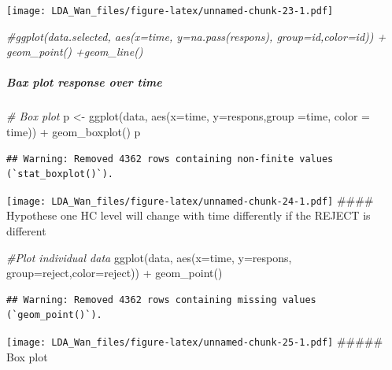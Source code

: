 \documentclass[
]{article}
\newenvironment{Shaded}{\begin{snugshade}}{\end{snugshade}}
\newcommand{\AttributeTok}[1]{\textcolor[rgb]{0.77,0.63,0.00}{#1}}
\newcommand{\CommentTok}[1]{\textcolor[rgb]{0.56,0.35,0.01}{\textit{#1}}}
\newcommand{\FunctionTok}[1]{\textcolor[rgb]{0.00,0.00,0.00}{#1}}
\newcommand{\NormalTok}[1]{#1}
\newcommand{\OtherTok}[1]{\textcolor[rgb]{0.56,0.35,0.01}{#1}}
\newcommand{\SpecialCharTok}[1]{\textcolor[rgb]{0.00,0.00,0.00}{#1}}
\begin{document}
\texttt{[image: LDA\_Wan\_files/figure-latex/unnamed-chunk-23-1.pdf]}

\begin{Shaded}
\begin{Highlighting}[]
\CommentTok{\#ggplot(data.selected, aes(x=time, y=na.pass(respons), group=id,color=id)) + geom\_point()  +geom\_line()}
\end{Highlighting}
\end{Shaded}

\hypertarget{bax-plot-response-over-time}{%
\subparagraph{Bax plot response over
time}\label{bax-plot-response-over-time}}

\begin{Shaded}
\begin{Highlighting}[]
\CommentTok{\# Box plot}
\NormalTok{p }\OtherTok{\textless{}{-}} \FunctionTok{ggplot}\NormalTok{(data, }\FunctionTok{aes}\NormalTok{(}\AttributeTok{x=}\NormalTok{time, }\AttributeTok{y=}\NormalTok{respons,}\AttributeTok{group =}\NormalTok{time, }\AttributeTok{color =}\NormalTok{ time)) }\SpecialCharTok{+}  
  \FunctionTok{geom\_boxplot}\NormalTok{()}
\NormalTok{p}
\end{Highlighting}
\end{Shaded}

\begin{verbatim}
## Warning: Removed 4362 rows containing non-finite values (`stat_boxplot()`).
\end{verbatim}

\texttt{[image: LDA\_Wan\_files/figure-latex/unnamed-chunk-24-1.pdf]}
\#\#\#\# Hypothese one HC level will change with time differently if the
REJECT is different

\begin{Shaded}
\begin{Highlighting}[]
\CommentTok{\#Plot individual data}
\FunctionTok{ggplot}\NormalTok{(data, }\FunctionTok{aes}\NormalTok{(}\AttributeTok{x=}\NormalTok{time, }\AttributeTok{y=}\NormalTok{respons, }\AttributeTok{group=}\NormalTok{reject,}\AttributeTok{color=}\NormalTok{reject)) }\SpecialCharTok{+} \FunctionTok{geom\_point}\NormalTok{() }
\end{Highlighting}
\end{Shaded}

\begin{verbatim}
## Warning: Removed 4362 rows containing missing values (`geom_point()`).
\end{verbatim}

\texttt{[image: LDA\_Wan\_files/figure-latex/unnamed-chunk-25-1.pdf]}
\#\#\#\#\# Box plot
\end{document}
